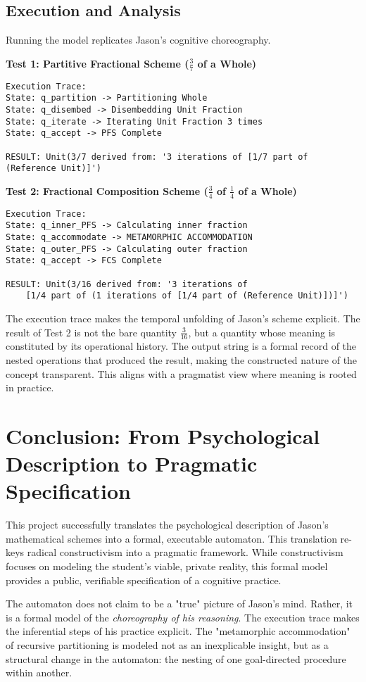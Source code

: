 \documentclass{article}
\begin{document}
\subsection{Execution and Analysis}
Running the model replicates Jason's cognitive choreography. 

\textbf{Test 1: Partitive Fractional Scheme ($\frac{3}{7}$ of a Whole)}
\begin{verbatim}
Execution Trace:
State: q_partition -> Partitioning Whole
State: q_disembed -> Disembedding Unit Fraction
State: q_iterate -> Iterating Unit Fraction 3 times
State: q_accept -> PFS Complete

RESULT: Unit(3/7 derived from: '3 iterations of [1/7 part of (Reference Unit)]')
\end{verbatim}

\textbf{Test 2: Fractional Composition Scheme ($\frac{3}{4}$ of $\frac{1}{4}$ of a Whole)}
\begin{verbatim}
Execution Trace:
State: q_inner_PFS -> Calculating inner fraction
State: q_accommodate -> METAMORPHIC ACCOMMODATION
State: q_outer_PFS -> Calculating outer fraction
State: q_accept -> FCS Complete

RESULT: Unit(3/16 derived from: '3 iterations of 
    [1/4 part of (1 iterations of [1/4 part of (Reference Unit)])]')
\end{verbatim}
The execution trace makes the temporal unfolding of Jason's scheme explicit. The result of Test 2 is not the bare quantity $\frac{3}{16}$, but a quantity whose meaning is constituted by its operational history. The output string is a formal record of the nested operations that produced the result, making the constructed nature of the concept transparent. This aligns with a pragmatist view where meaning is rooted in practice.

\section{Conclusion: From Psychological Description to Pragmatic Specification}
This project successfully translates the psychological description of Jason's mathematical schemes into a formal, executable automaton. This translation re-keys radical constructivism into a pragmatic framework. While constructivism focuses on modeling the student's viable, private reality, this formal model provides a public, verifiable specification of a cognitive practice.

The automaton does not claim to be a "true" picture of Jason's mind. Rather, it is a formal model of the \textit{choreography of his reasoning}. The execution trace makes the inferential steps of his practice explicit. The "metamorphic accommodation" of recursive partitioning is modeled not as an inexplicable insight, but as a structural change in the automaton: the nesting of one goal-directed procedure within another.
\end{document}
